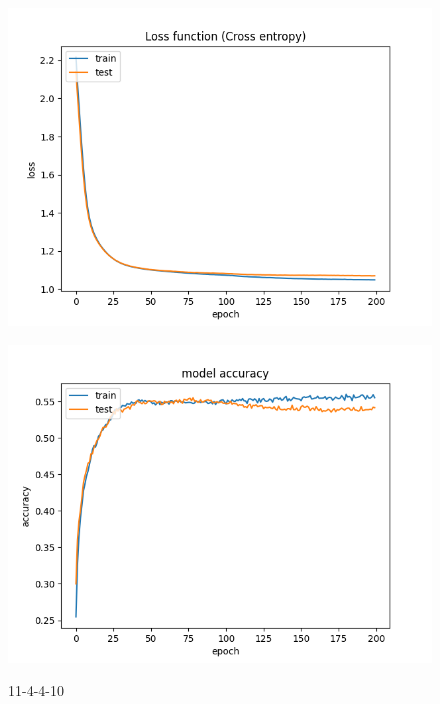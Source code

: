 \begin{figure}[!htb]
    \begin{minipage}{0.5\textwidth}
        \centering
        \includegraphics[width=1\textwidth]{../images/11-4-4/Loss_function(Cross_entropy).png}
        \label{fig:11-4-4-10}
    \end{minipage}\hfill
    \begin{minipage}{0.5\textwidth}
        \centering
        \includegraphics[width=1\textwidth]{../images/11-4-4/model_accuracy(Cross_entropy).png}
        \label{fig:8-4-4-10.2}
    \end{minipage}
    \caption{11-4-4-10}
\end{figure}

